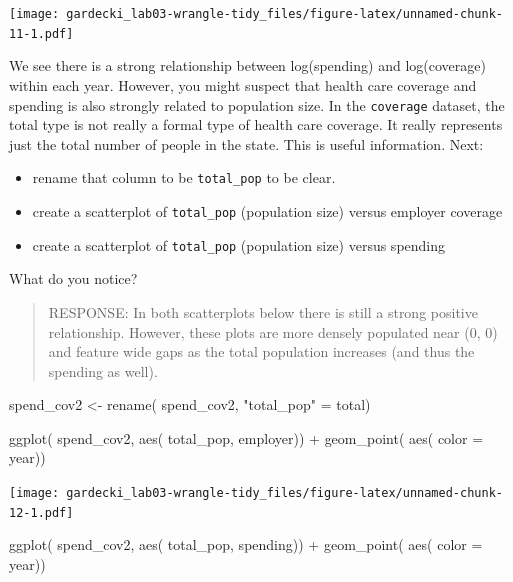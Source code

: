 \documentclass[
]{article}
\newenvironment{Shaded}{\begin{snugshade}}{\end{snugshade}}
\newcommand{\AttributeTok}[1]{\textcolor[rgb]{0.77,0.63,0.00}{#1}}
\newcommand{\FunctionTok}[1]{\textcolor[rgb]{0.00,0.00,0.00}{#1}}
\newcommand{\NormalTok}[1]{#1}
\newcommand{\OtherTok}[1]{\textcolor[rgb]{0.56,0.35,0.01}{#1}}
\newcommand{\SpecialCharTok}[1]{\textcolor[rgb]{0.00,0.00,0.00}{#1}}
\newcommand{\StringTok}[1]{\textcolor[rgb]{0.31,0.60,0.02}{#1}}
\providecommand{\tightlist}{%
  \setlength{\itemsep}{0pt}\setlength{\parskip}{0pt}}
\begin{document}
\texttt{[image: gardecki\_lab03-wrangle-tidy\_files/figure-latex/unnamed-chunk-11-1.pdf]}

We see there is a strong relationship between log(spending) and
log(coverage) within each year. However, you might suspect that health
care coverage and spending is also strongly related to population size.
In the \texttt{coverage} dataset, the total type is not really a formal
type of health care coverage. It really represents just the total number
of people in the state. This is useful information. Next:

\begin{itemize}
\tightlist
\item
  rename that column to be \texttt{total\_pop} to be clear.
\item
  create a scatterplot of \texttt{total\_pop} (population size) versus
  employer coverage
\item
  create a scatterplot of \texttt{total\_pop} (population size) versus
  spending
\end{itemize}

What do you notice?

\begin{quote}
RESPONSE: In both scatterplots below there is still a strong positive
relationship. However, these plots are more densely populated near (0,
0) and feature wide gaps as the total population increases (and thus the
spending as well).
\end{quote}

\begin{Shaded}
\begin{Highlighting}[]
\NormalTok{ spend\_cov2 }\OtherTok{\textless{}{-}} \FunctionTok{rename}\NormalTok{( spend\_cov2, }\StringTok{"total\_pop"} \OtherTok{=}\NormalTok{ total)}

\FunctionTok{ggplot}\NormalTok{( spend\_cov2, }\FunctionTok{aes}\NormalTok{( total\_pop, employer)) }\SpecialCharTok{+} \FunctionTok{geom\_point}\NormalTok{( }\FunctionTok{aes}\NormalTok{( }\AttributeTok{color =}\NormalTok{ year))}
\end{Highlighting}
\end{Shaded}

\texttt{[image: gardecki\_lab03-wrangle-tidy\_files/figure-latex/unnamed-chunk-12-1.pdf]}

\begin{Shaded}
\begin{Highlighting}[]
\FunctionTok{ggplot}\NormalTok{( spend\_cov2, }\FunctionTok{aes}\NormalTok{( total\_pop, spending)) }\SpecialCharTok{+} \FunctionTok{geom\_point}\NormalTok{( }\FunctionTok{aes}\NormalTok{( }\AttributeTok{color =}\NormalTok{ year))}
\end{Highlighting}
\end{Shaded}
\end{document}

